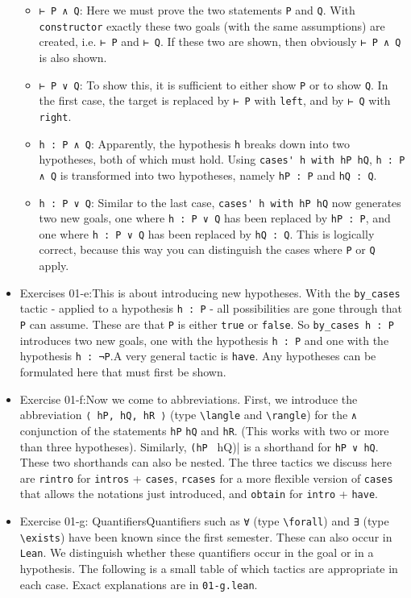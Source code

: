 \documentclass{memoir}
\begin{document}
\begin{itemize}
\begin{itemize}
\item \Verb|⊢ P ∧ Q|: Here we must prove the two statements \Verb|P| and \Verb|Q|. With \Verb|constructor| exactly these two goals (with the same assumptions) are created, i.e. \Verb|⊢ P| and \Verb|⊢ Q|. If these two are shown, then obviously \Verb|⊢ P ∧ Q| is also shown.\item \Verb|⊢ P ∨ Q|: To show this, it is sufficient to either show \Verb|P| or to show \Verb|Q|. In the first case, the target is replaced by \Verb|⊢ P| with \Verb|left|, and by \Verb|⊢ Q| with \Verb|right|.\item \Verb|h : P ∧ Q|: Apparently, the hypothesis \Verb|h| breaks down into two hypotheses, both of which must hold. Using \Verb|cases' h with hP hQ|, \Verb|h : P ∧ Q| is transformed into two hypotheses, namely \Verb|hP : P| and \Verb|hQ : Q|.\item \Verb|h : P ∨ Q|: Similar to the last case, \Verb|cases' h with hP hQ| now generates two new goals, one where \Verb|h : P ∨ Q| has been replaced by \Verb|hP : P|, and one where \Verb|h : P ∨ Q| has been replaced by \Verb|hQ : Q|. This is logically correct, because this way you can distinguish the cases where \Verb|P| or \Verb|Q| apply.
\end{itemize}
\item Exercises 01-e:This is about introducing new hypotheses. With the \Verb|by_cases| tactic - applied to a hypothesis \Verb|h : P| - all possibilities are gone through that \Verb|P| can assume. These are that \Verb|P| is either \Verb|true| or \Verb|false|. So \Verb|by_cases h : P| introduces two new goals, one with the hypothesis \Verb|h : P| and one with the hypothesis \Verb|h : ¬P|.A very general tactic is \Verb|have|. Any hypotheses can be formulated here that must first be shown.\item Exercise 01-f:Now we come to abbreviations. First, we introduce the abbreviation \Verb|⟨ hP, hQ, hR ⟩| (type \Verb|\langle| and \Verb|\rangle|) for the \Verb|∧| conjunction of the statements \Verb|hP| \Verb|hQ| and \Verb|hR|. (This works with two or more than three hypotheses). Similarly, \Verb|(hP | hQ)| is a shorthand for \Verb|hP ∨ hQ|. These two shorthands can also be nested. The three tactics we discuss here are \Verb|rintro| for \Verb|intros| + \Verb|cases|, \Verb|rcases| for a more flexible version of \Verb|cases| that allows the notations just introduced, and \Verb|obtain| for \Verb|intro| + \Verb|have|.\item Exercise 01-g: QuantifiersQuantifiers such as \Verb|∀| (type \Verb|\forall|) and \Verb|∃| (type \Verb|\exists|) have been known since the first semester. These can also occur in \Verb|Lean|. We distinguish whether these quantifiers occur in the goal or in a hypothesis. The following is a small table of which tactics are appropriate in each case. Exact explanations are in \Verb|01-g.lean|.
\end{itemize}
\end{document}
